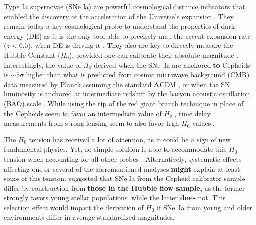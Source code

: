 \documentclass[]{aa}
\begin{document}
Type Ia supernovae (SNe Ia) are powerful cosmological distance indicators that
enabled the discovery of the acceleration of the Universe's expansion
\citep{riess1998, perlmutter1999}. They remain today a key cosmological probe to
understand the properties of dark energy (DE) as it is the only tool able to
precisely map the recent expansion rate ($z<0.5$), when DE is driving it
\citep[e.g.][]{scolnicastro2020}. They also are key to directly measure the
Hubble Constant ($H_0$), provided one can calibrate their absolute magnitude
\citep{riess2016, freedman2019}. Interestingly, the value of $H_0$ derived when
the SNe~Ia are anchored \textbf{to} Cepheids \citep[the SH0ES
project,][]{riess2009, riess2016} is $\sim5\sigma$ higher than what is predicted
from cosmic microwave background (CMB) data measured by Planck assuming the
standard $\Lambda$CDM \citep{planck2018, riess2019, reid2019}, or when the SN
luminosity is anchored at intermediate redshift by the baryon acoustic
oscillation (BAO) scale \citep{feeney2019}. While using the tip of the red giant
branch technique in place of the Cepheids seem to favor an intermediate value of
$H_0$ \citep{freedman2019, freedman2020}, time delay measurements from strong
lensing seem to also favor high $H_0$ values \citep{wong2019}.

The $H_0$ tension has received a lot of attention, as it could be a sign of new
fundamental physics. Yet, no simple solution is able to accommodate this $H_0$
tension when accounting for all other probes \citep{knox2019}. Alternatively,
systematic effects affecting one or several of the aforementioned analyses
\textbf{might} explain at least some of this tension. \cite{rigault2015}
suggested that SNe Ia from the Cepheid calibrator sample differ by construction
from \textbf{those in the Hubble flow sample,} as the former strongly favors
young stellar populations, while the latter \textbf{does} not. This selection
effect would impact the derivation of $H_0$ if SNe~Ia from young and older
environments differ in average standardized magnitudes. 
\end{document}
